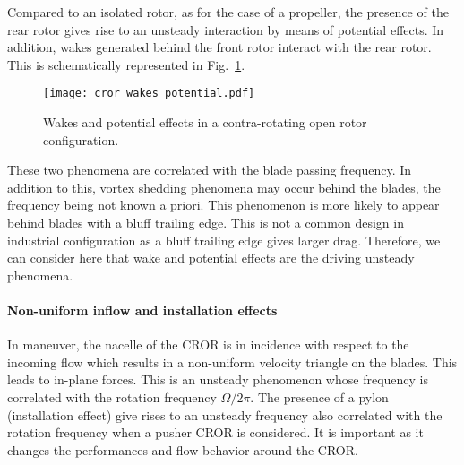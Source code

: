 Compared to an isolated rotor, as for the case of a propeller,
the presence of the rear rotor gives rise to an unsteady
interaction by means of potential effects. In addition, wakes generated
behind the front rotor interact with the rear rotor.
This is schematically represented in Fig.~\ref{fig:cror_wakes_potential}.
\begin{figure}[htp]
  \centering
  \texttt{[image: cror\_wakes\_potential.pdf]}
  \caption{Wakes and potential effects in a 
  contra-rotating open rotor configuration.}
  \label{fig:cror_wakes_potential}
\end{figure}
These two phenomena are correlated with the blade passing frequency.
In addition to this, vortex shedding phenomena may occur behind the blades, 
the frequency being not known a priori.
This phenomenon is more likely to appear behind blades with a bluff trailing edge.
This is not a common design in industrial configuration as a bluff trailing edge
gives larger drag. Therefore, we can consider here that 
wake and potential effects are the driving unsteady phenomena.

\paragraph{Non-uniform inflow and installation effects}

In maneuver, the nacelle of the CROR is in incidence with respect to the incoming flow
which results in a non-uniform velocity triangle on the blades.
This leads to in-plane forces. This is an unsteady phenomenon
whose frequency is correlated with the rotation frequency $\Omega / 2 \pi$.
The presence of a pylon (installation effect) give rises to an unsteady frequency
also correlated with the rotation frequency when a pusher CROR is considered.
It is important as it changes the performances and flow behavior around the CROR.
